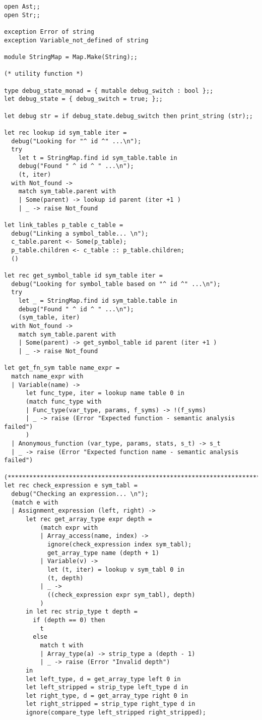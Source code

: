\begin{verbatim}
open Ast;;
open Str;;

exception Error of string
exception Variable_not_defined of string

module StringMap = Map.Make(String);;

(* utility function *)

type debug_state_monad = { mutable debug_switch : bool };;
let debug_state = { debug_switch = true; };;

let debug str = if debug_state.debug_switch then print_string (str);;

let rec lookup id sym_table iter =
  debug("Looking for "^ id ^" ...\n");
  try
    let t = StringMap.find id sym_table.table in
    debug("Found " ^ id ^ " ...\n");
    (t, iter)
  with Not_found ->
    match sym_table.parent with
    | Some(parent) -> lookup id parent (iter +1 )
    | _ -> raise Not_found

let link_tables p_table c_table =
  debug("Linking a symbol_table... \n");
  c_table.parent <- Some(p_table);
  p_table.children <- c_table :: p_table.children;
  ()

let rec get_symbol_table id sym_table iter =
  debug("Looking for symbol_table based on "^ id ^" ...\n");
  try
    let _ = StringMap.find id sym_table.table in
    debug("Found " ^ id ^ " ...\n");
    (sym_table, iter)
  with Not_found ->
    match sym_table.parent with
    | Some(parent) -> get_symbol_table id parent (iter +1 )
    | _ -> raise Not_found

let get_fn_sym table name_expr =
  match name_expr with
  | Variable(name) ->
      let func_type, iter = lookup name table 0 in
      (match func_type with
      | Func_type(var_type, params, f_syms) -> !(f_syms)
      | _ -> raise (Error "Expected function - semantic analysis failed")
      )
  | Anonymous_function (var_type, params, stats, s_t) -> s_t
  | _ -> raise (Error "Expected function name - semantic analysis failed")
    
(***************************************************************************)
let rec check_expression e sym_tabl =
  debug("Checking an expression... \n");
  (match e with
  | Assignment_expression (left, right) ->
      let rec get_array_type expr depth =
          (match expr with
          | Array_access(name, index) ->
            ignore(check_expression index sym_tabl);
            get_array_type name (depth + 1)
          | Variable(v) ->
            let (t, iter) = lookup v sym_tabl 0 in
            (t, depth)
          | _ ->
            ((check_expression expr sym_tabl), depth)
          )
      in let rec strip_type t depth =
        if (depth == 0) then
          t
        else
          match t with
          | Array_type(a) -> strip_type a (depth - 1)
          | _ -> raise (Error "Invalid depth")
      in
      let left_type, d = get_array_type left 0 in
      let left_stripped = strip_type left_type d in
      let right_type, d = get_array_type right 0 in 
      let right_stripped = strip_type right_type d in
      ignore(compare_type left_stripped right_stripped);


\end{verbatim}
